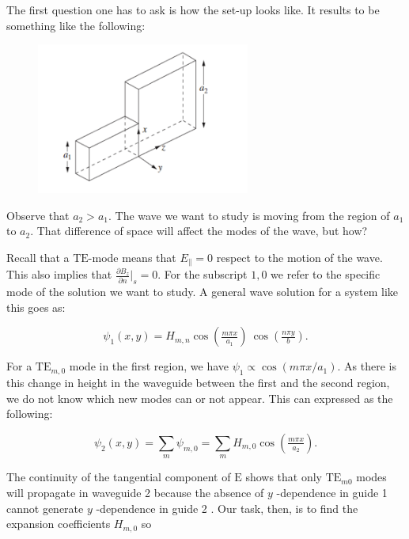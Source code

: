 The first question one has to ask is how the set-up looks like. It results to be something like the following:

\begin{figure}[h!]
	\includegraphics[width=7cm]{figures/waveguide_discontinuity.png}
	\centering
\end{figure}

Observe that $a_{2} > a_{1}$. The wave we want to study is moving from the region of $a_{1}$ to $a_{2}$. That difference of space will affect the modes of the wave, but how?

Recall that a $\mathrm{TE}$-mode means that $E_{\parallel} =0$ respect to the motion of the wave. This also implies that $\frac{\partial B_{z}}{\partial n}|_{s}=0$. For the subscript $1,0$ we refer to the specific mode of the solution we want to study. A general wave solution for a system like this goes as:

\begin{equation}
	\psi_{1} (x,y) = H_{m,n} \cos \left(\tfrac{m \pi x}{a_{1}}\right) \: \cos \left(\tfrac{n \pi y}{b}\right).
\end{equation}

For a $\mathrm{TE}_{m,0}$ mode in the first region, we have $\psi_{1} \propto \cos \left(m \pi x / a_{1}\right)$. As there is this change in height in the waveguide between the first and the second region, we do not know which new modes can or not appear. This can expressed as the following:

\begin{equation}
	\psi_{2} (x,y) = \sum_{m} \psi_{m,0} = \sum_{m} H_{m,0} \cos\left(\tfrac{m \pi x}{a_{2}}\right).
\end{equation}

The continuity of the tangential component of $\mathrm{E}$ shows that only $\mathrm{TE}_{m 0}$ modes will propagate in waveguide 2 because the absence of $y$ -dependence in guide 1 cannot generate $y$ -dependence in guide 2 . Our task, then, is to find the expansion coefficients $H_{m,0}$ so


